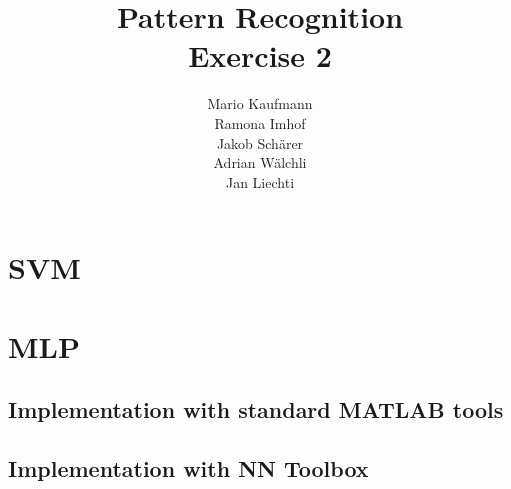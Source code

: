 \documentclass[a4paper]{article}
\title{Pattern Recognition\\Exercise 2}
\author{Mario Kaufmann \\ Ramona Imhof \\ Jakob Sch\"arer \\ Adrian W\"alchli \\ Jan Liechti}
\begin{document}
\maketitle

\section{SVM}

\section{MLP}

\subsection{Implementation with standard MATLAB tools}

\subsection{Implementation with NN Toolbox}



\end{document}
